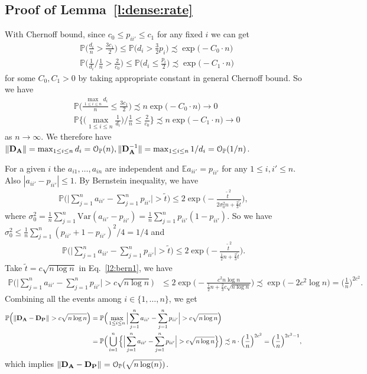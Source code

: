 \documentclass[10pt,journal,compsoc]{IEEEtran}
\newcommand{\op}{\mathcal{O}_{\mathbb{P}}}
\newcommand*{\p}{\mathbb{P}}
\newcommand{\ee}{\end{aligned} \end{equation}}
\newcommand{\E}{\mathbb{E}}
\newcommand{\BL}{\Big (}
\newcommand{\BR}{\Big )}
\newcommand{\bee}{\begin{equation}\begin{aligned}}
\newcommand{\M}[1]{{{\mathbf{\MakeUppercase{#1}}}}}
\numberwithin{equation}{section}
\begin{document}
\subsection{Proof of Lemma~\ref{l:dense:rate}}
\noindent{\textbf{(1) $\|\M D_{\M A}\|_{}$, $\|\M D^{-1}_{\M A}\|_{}$: }}With Chernoff bound, since $c_0\leq p_{ii'}\leq c_1$ for any fixed $i$ we can get
\bee\nonumber
&\p\BL \frac{d_i}{n} > \frac{3c_1}{2}\BR\leq \p\Big(d_i > \frac{3}{2}p_i\Big) \precsim \exp\big(-C_0\cdot n\big)
\\
&\p\BL \frac{1}{d_i}\Big/\frac{1}{n} > \frac{2}{c_0}\BR \leq \p\Big({d_i} \leq \frac{p_i}{2}\Big) \precsim \exp\big(-C_1\cdot n\big)
\ee
for some $C_0,C_1 > 0$ by taking appropriate constant in general Chernoff bound. So we have
\bee\nonumber
&\p\BL \frac{\max_{1\leq i \leq n}d_i}{n} 
\leq \frac{3c_1}{2}\BR\precsim n\exp\big(-C_0\cdot n\big) \longrightarrow 0
\\
&\p\Big\{\Big(\max_{1\leq i \leq n}\frac{1}{d_i}\Big)\Big/\frac{1}{n} \leq \frac{2}{c_0}\Big\} \precsim n\exp\big(-C_1\cdot n\big) \longrightarrow 0
\ee
as $n \rightarrow \infty$. We therefore have $\|\M D_{\M A}\| = \max_{1\leq i \leq n}d_i = \op(n),\|\M D_{\M A}^{-1}\| = \max_{1\leq i \leq n} 1/d_i = \op(1/n)$.

\noindent{\textbf{(2) $\|\M D_{\M A} - \M D_{\M P}\|_{}$: }}For a given $i$ the $a_{i1},\dots,a_{in}$ are independent and $\E a_{ii'} = p_{ii'}$ for any $1\leq i,{i'} \leq n$. Also $|a_{ii'} - p_{ii'}|\leq 1$. By Bernstein inequality, we have
\bee\nonumber
\p\Big(\Big|\sum_{j = 1}^{n}a_{ii'} - \sum_{j = 1}^{n}p_{ii'}\Big|> \tilde{t}\Big) \leq 2 \exp\Big(-\frac{\tilde{t}^2}{2\sigma_0^2n + \frac{2}{3}\tilde{t}}\Big),
\ee
where $\sigma_0^2 = \frac{1}{n}\sum_{j = 1}^{n}\text{Var}(a_{ii'} - p_{ii'}) = \frac{1}{n}\sum_{j=1}^{n}p_{ii'}(1-p_{ii'}).$ So we have $\sigma_0^2\leq \frac{1}{n}\sum_{j=1}^{n}(p_{ii'} + 1-p_{ii'})^2/4 = 1/4$ and 
\bee\label{l2:bern1}
\p\Big(\Big|\sum_{j = 1}^{n}a_{ii'} - \sum_{j = 1}^{n}p_{ii'}\Big|> \tilde{t}\Big) \leq 2 \exp\Big(-\frac{\tilde{t}^2}{\frac{1}{2}n + \frac{2}{3}\tilde{t}}\Big).
\ee
Take $\tilde{t} = c\sqrt{n \log n}$ in Eq.~\eqref{l2:bern1}, we have
\bee\nonumber
\p\Big(\Big|\sum_{j = 1}^{n}a_{ii'} - \sum_{j = 1}^{n}p_{ii'}\Big|>
c\sqrt{n \log n}\Big)
&\leq 2 \exp\Big(-\frac{c^2 n \log
  n}{\frac{1}{2}n + \frac{2}{3}c\sqrt{n \log n}}\Big)
\precsim\exp\Big(-2c^2 \log n\Big) 
= \Big(\frac{1}{n}\Big)^{2c^2}.
\ee
Combining all the events among $i \in \{1,\dots,n\}$, we get
\bee\nonumber
\p\BL \|\M D_{\M A} - \M D_{\M P}\|_{} > c\sqrt{n \log n}\BR 
&=
\p\BL\max_{1 \leq i\leq n}\Big|\sum_{j = 1}^{n}a_{ii'} - \sum_{j =
  1}^{n}p_{ii'}\Big|> c\sqrt{n \log n} \BR 
\\ &= \p\BL \bigcup_{i = 1}^{n}\Big\{\Big|\sum_{j = 1}^{n}a_{ii'} -
\sum_{j = 1}^{n}p_{ii'}\Big|> c\sqrt{n \log n}\Big\}\BR 
\precsim n\cdot \BL \frac{1}{n}\BR^{2c^2} 
= \BL \frac{1}{n}\BR^{2c^2-1},
\ee
which implies $\|\M D_{\M A} - \M D_{\M P}\|_{} = \op(\sqrt{n \log (n)})$.
\end{document}
